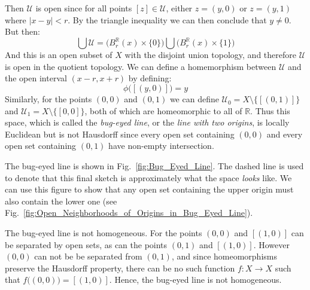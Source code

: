 \begin{example}
\begin{equation}
                \end{equation}
                Then $\mathcal{U}$ is open since for all points
                $[z]\in\mathcal{U}$, either $z=(y,0)$ or $z=(y,1)$ where
                $|x-y|<r$. By the triangle inequality we can then conclude that
                $y\ne{0}$. But then:
                \begin{equation}
                    \bigcup\mathcal{U}=\Big(B_{r}^{\mathbb{R}}(x)\times\{0\}\Big)
                        \bigcup\Big(B_{r}^{\mathbb{R}}(x)\times\{1\}\Big)
                \end{equation}
                And this is an open subset of $X$ with the disjoint union
                topology, and therefore $\mathcal{U}$ is open in the quotient
                topology. We can define a homemorphism between $\mathcal{U}$ and
                the open interval $(x-r,x+r)$ by defining:
                \begin{equation}
                    \phi\big([(y,0)]\big)=y
                \end{equation}
                Similarly, for the points $(0,0)$ and $(0,1)$ we can define
                $\mathcal{U}_{0}=X\setminus\{[(0,1)]\}$ and
                $\mathcal{U}_{1}=X\setminus\{[0,0]\}$, both of which are
                homeomorphic to all of $\mathbb{R}$. Thus this space, which is
                called the \textit{bug-eyed line}, or the
                \textit{line with two origins}, is
                locally Euclidean but is not Hausdorff since every open set
                containing $(0,0)$ and every open set containing $(0,1)$ have
                non-empty intersection.
        \end{example}
        The bug-eyed line is shown in
        Fig.~\ref{fig:Bug_Eyed_Line}. The dashed line is used to denote that
        this final sketch is approximately what the space \textit{looks}
        like. We can use this figure to show that any open set containing
        the upper origin must also contain the lower one
        (see Fig.~\ref{fig:Open_Neighborhoods_of_Origins_in_Bug_Eyed_Line}).
        \begin{example}
                The bug-eyed line is not homogeneous. For the points $(0,0)$ and
                $[(1,0)]$ can be separated by open sets, as can the points
                $(0,1)$ and $[(1,0)]$. However $(0,0)$ can not be be separated
                from $(0,1)$, and since homeomorphisms preserve the Hausdorff
                property, there can be no such function $f:X\rightarrow{X}$ such
                that $f\big((0,0)\big)=[(1,0)]$. Hence, the bug-eyed line is
                not homogeneous.
        \end{example}

